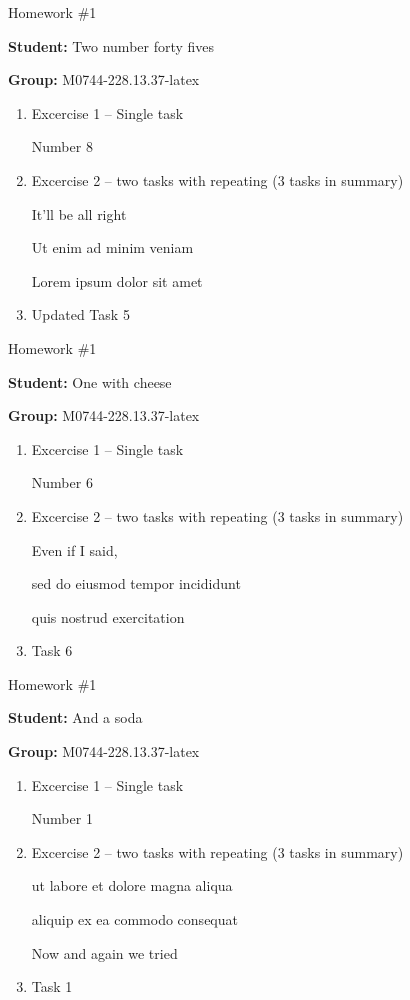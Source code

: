 \documentclass[12pt, fleqn, a4paper]{article}
\newcommand{\preamble}{\lipsum[1]}
\newcommand{\generatepage}[4]{
	\begin{center}
		{\Large #1}

		\textbf{Student:} #2

		\textbf{Group:} #3

	\end{center}

	\vspace{10pt}

	\preamble

	\begin{enumerate}
		#4
	\end{enumerate}

	\pagebreak
}
\begin{document}
	\generatepage{Homework \#1}{Two number forty fives}{M0744-228.13.37-latex}{
		\item Excercise 1 -- Single task

			Number 8
		\item Excercise 2 -- two tasks with repeating (3 tasks in summary)

			It'll be all right

			Ut enim ad minim veniam

			Lorem ipsum dolor sit amet
		\item 

			Updated Task 5
	}

	\generatepage{Homework \#1}{One with cheese}{M0744-228.13.37-latex}{
		\item Excercise 1 -- Single task

			Number 6
		\item Excercise 2 -- two tasks with repeating (3 tasks in summary)

			Even if I said,

			sed do eiusmod tempor incididunt 

			quis nostrud exercitation 
		\item 

			Task 6
	}

	\generatepage{Homework \#1}{And a {\LARGE soda}}{M0744-228.13.37-latex}{
		\item Excercise 1 -- Single task

			Number 1
		\item Excercise 2 -- two tasks with repeating (3 tasks in summary)

			ut labore et dolore magna aliqua 

			aliquip ex ea commodo consequat

			Now and again we tried
		\item 

			Task 1
	}
\end{document}
